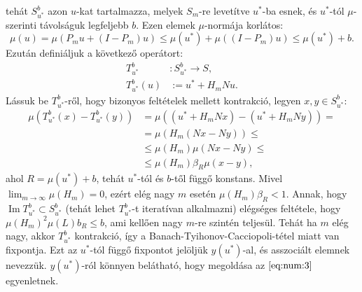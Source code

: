 \documentclass[oneside, titlepage, 12pt, a4paper]{report}
\DeclareMathOperator{\Ima}{Im}	%
\begin{document}
tehát $S_{u^*}^b$ azon $u$-kat tartalmazza, melyek $S_m$-re levetítve $u^*$-ba esnek, és $u^*$-tól $\mu$-szerinti távolságuk legfeljebb $b$. Ezen elemek $\mu$-normája korlátos:
\begin{equation*}
\mu(u) = \mu(P_m u + (I - P_m) u) \leq \mu(u^*) + \mu((I - P_m)u) \leq \mu(u^*) + b.
\end{equation*}
 Ezután definiáljuk a következő operátort:
\begin{align*}
T_{u^*}^b &: S_{u^*}^b \rightarrow S, \\
T_{u^*}^b (u) &:= u^* + H_m N u.
\end{align*}
Lássuk be $T_{u^*}^b$-ről, hogy bizonyos feltételek mellett kontrakció, legyen $x, y \in S_{u^*}^b$:
\begin{align*}
\mu( T_{u^*}^b(x) - T_{u^*}^b(y)) &= \mu((u^* + H_m N x) - (u^* + H_m N y)) = \\
&= \mu(H_m(N x - N y)) \leq \\
&\leq \mu(H_m) \mu(N x - N y) \leq \\
&\leq \mu(H_m) \beta_R \mu(x - y),
\end{align*}
ahol $R = \mu(u^*) + b$, tehát $u^*$-tól és $b$-től függő konstans. Mivel $\lim_{m \to \infty} \mu(H_m) = 0$, ezért elég nagy $m$ esetén $\mu(H_m) \beta_R < 1$. Annak, hogy $\Ima  T_{u^*}^b \subset S_{u^*}^b$ (tehát lehet $ T_{u^*}^b$-t iteratívan alkalmazni) elégséges feltétele, hogy $\mu(H_m)^2 \mu(L) b_R \leq b$, ami kellően nagy $m$-re szintén teljesül. Tehát ha $m$ elég nagy, akkor $ T_{u^*}^b$ kontrakció, így a Banach-Tyihonov-Cacciopoli-tétel miatt van fixpontja. Ezt az $u^*$-tól függő fixpontot jelöljük $y(u^*)$-al, és asszociált elemnek nevezzük. $y(u^*)$-ról könnyen belátható, hogy megoldása az $\eqref{eq:num:3}$ egyenletnek. \\ %







 

 
\end{document}
